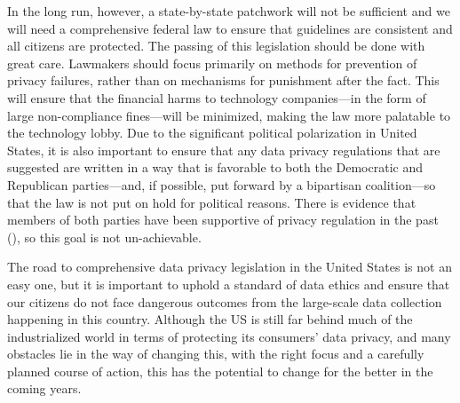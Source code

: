 \documentclass[water,article,submit,moreauthors,pdftex]{mdpi}
\begin{document}
In the long run, however, a state-by-state patchwork will not be
sufficient and we will need a comprehensive federal law to ensure that
guidelines are consistent and all citizens are protected. The passing of
this legislation should be done with great care. Lawmakers should focus
primarily on methods for prevention of privacy failures, rather than on
mechanisms for punishment after the fact. This will ensure that the
financial harms to technology companies---in the form of large
non-compliance fines---will be minimized, making the law more palatable
to the technology lobby. Due to the significant political polarization
in United States, it is also important to ensure that any data privacy
regulations that are suggested are written in a way that is favorable to
both the Democratic and Republican parties---and, if possible, put
forward by a bipartisan coalition---so that the law is not put on hold
for political reasons. There is evidence that members of both parties
have been supportive of privacy regulation in the past
(\citet{privacy-law-bipartisan}), so this goal is not un-achievable.

The road to comprehensive data privacy legislation in the United States
is not an easy one, but it is important to uphold a standard of data
ethics and ensure that our citizens do not face dangerous outcomes from
the large-scale data collection happening in this country. Although the
US is still far behind much of the industrialized world in terms of
protecting its consumers' data privacy, and many obstacles lie in the
way of changing this, with the right focus and a carefully planned
course of action, this has the potential to change for the better in the
coming years.

%

\vspace{6pt}



\end{document}
